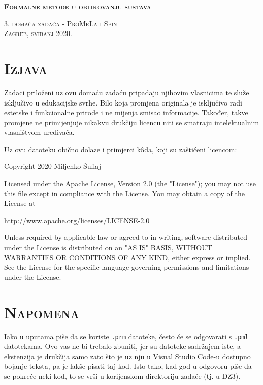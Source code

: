 \documentclass{article}
\newcommand{\crnotice}[1]
{
    \begin{center}
        \colorbox{red!15}{\parbox{\textwidth}{#1}}
    \end{center}
}
\newcommand{\sekcija}[1]{\section{\textsc{#1}}}
\begin{document}
\begin{titlepage}
    \centering
    \vspace*{\fill}

    \huge
    \textbf{\textsc{Formalne metode u oblikovanju sustava}} \\
    
    \vspace*{0.5cm}
    
    \large
    \textsc{3. domaća zadaća - ProMeLa i Spin} \\

    \vspace*{\fill}
    \textsc{Zagreb, svibanj 2020.}
\end{titlepage}

\tableofcontents
\pagebreak



\sekcija{Izjava}

Zadaci priloženi uz ovu domaću zadaću pripadaju njihovim vlasnicima te služe isključivo u edukacijske svrhe. Bilo koja promjena originala je isključivo radi estetske i funkcionalne prirode i ne mijenja smisao informacije. Također, takve promjene ne primijenjuje nikakvu drukčiju licencu niti se smatraju intelektualnim vlasništvom uređivača.
\newline

Uz ovu datoteku obično dolaze i primjerci kôda, koji su zaštićeni licencom:

\crnotice
{
    Copyright 2020 Miljenko Šuflaj
    \newline

    Licensed under the Apache License, Version 2.0 (the "License");
    you may not use this file except in compliance with the License.
    You may obtain a copy of the License at
    \newline

        \quad
        http://www.apache.org/licenses/LICENSE-2.0
        \newline

    Unless required by applicable law or agreed to in writing, software
    distributed under the License is distributed on an "AS IS" BASIS,
    WITHOUT WARRANTIES OR CONDITIONS OF ANY KIND, either express or implied.
    See the License for the specific language governing permissions and
    limitations under the License.
}

\sekcija{Napomena}

Iako u uputama piše da se koriste \texttt{.prm} datoteke, često će se odgovarati s \texttt{.pml} datotekama. Ovo vas ne bi trebalo zbuniti, jer su datoteke sadržajem iste, a ekstenzija je drukčija samo zato što je uz nju u Visual Studio Code-u dostupno bojanje teksta, pa je lakše pisati taj kod. Isto tako, kad god u odgovoru piše da se pokreće neki kod, to se vrši u korijenskom direktoriju zadaće (tj. u DZ3).
\end{document}

